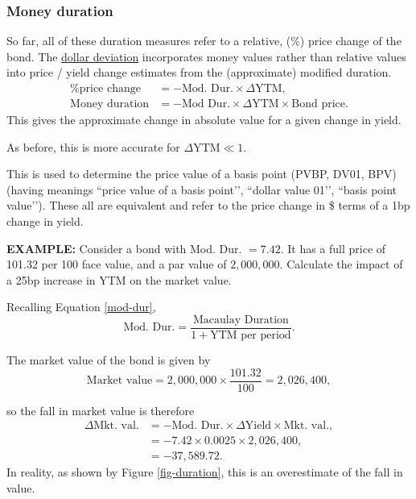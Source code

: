 \documentclass[../notes_compiled.tex]{subfiles}
\begin{document}
\subsubsection{Money duration}
\begin{itemize}
\item So far, all of these duration measures refer to a relative, (\%) price change of the bond. The \underline{dollar deviation} incorporates money values rather than relative values into price / yield change estimates from the (approximate) modified duration.
\begin{align}
\text{\% price change} &= -\text{Mod. Dur.} \times \Delta\text{YTM}, \nonumber \\
\text{Money duration} &= - \text{Mod Dur.} \times \Delta\text{YTM} \times \text{Bond price}.
\end{align}
This gives the approximate change in absolute value for a given change in yield.
\item As before, this is more accurate for $\Delta\text{YTM} \ll 1$.
\item This is used to determine the price value of a basis point (PVBP, DV01, BPV) (having meanings ``price value of a basis point’’, ``dollar value 01’’, ``basis point value’’). These all are equivalent and refer to the price change in \$ terms of a 1bp change in yield.
{\color{RedViolet}
\item[] \textbf{EXAMPLE:} Consider a bond with Mod. Dur. $=7.42$. It has a full price of 101.32 per 100 face value, and a par value of $2,000,000$. Calculate the impact of a 25bp increase in YTM on the market value.
}
{\color{RoyalBlue}
Recalling Equation \ref{mod-dur},
\begin{equation*}
\text{Mod. Dur.} = \frac{\text{Macaulay Duration}}{1+\text{YTM per period}}.
\end{equation*}

The market value of the bond is given by 
\begin{equation*}
\text{Market value} = 2,000,000 \times \frac{101.32}{100} = 2,026,400,
\end{equation*}

so the fall in market value is therefore
\begin{align*}
\Delta \text{Mkt. val.} &= -\text{Mod. Dur.} \times \Delta \text{Yield} \times \text{Mkt. val.}, \\
&= -7.42\times 0.0025 \times 2,026,400, \\
&=-37,589.72.
\end{align*}
In reality, as shown by Figure \ref{fig-duration}, this is an overestimate of the fall in value.

}
\end{itemize}
\end{document}
